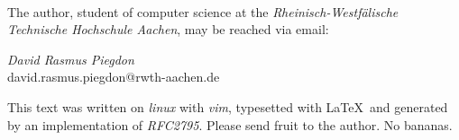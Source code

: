 \documentclass[twoside,a4paper,graphics,11pt,dvips]{article}
\begin{document}
\pagestyle{empty}

\newlength{\centeroffset}
\setlength{\centeroffset}{-0.5\oddsidemargin}
\addtolength{\centeroffset}{0.5\evensidemargin}
\thispagestyle{empty}
\noindent\hspace*{\centeroffset}


\noindent\hspace*{\centeroffset}


\pagebreak
\begin{small}

%
\ 


The author, student of computer science at the \emph{Rheinisch-Westf\"alische Technische Hochschule
Aachen}, may be reached via email:

\begin{center}

	\textit{David Rasmus Piegdon} \\ david.rasmus.piegdon@rwth-aachen.de

\end{center}

This text was written on \emph{linux} with \emph{vim}, typesetted with \LaTeX\ and generated by an
implementation of \emph{RFC2795}. Please send fruit to the author. No bananas.

\end{small}
\end{document}
